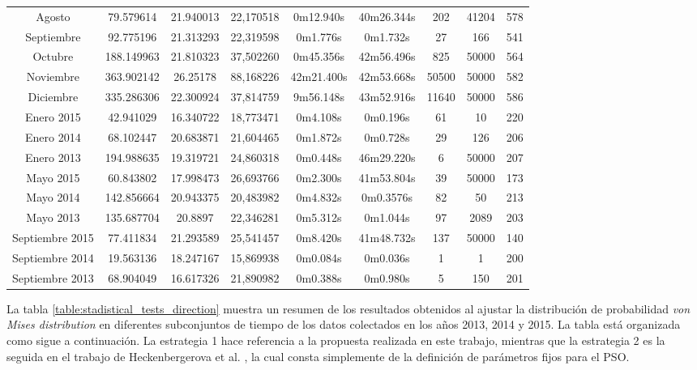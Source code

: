 \begin{table}[ht!]
{\begin{tabular}{|c|c|c|c|c|c|c|c|c|}
        Agosto          & 79.579614     & 21.940013     & 22,170518     & 0m12.940s     & 40m26.344s    & 202   & 41204 & 578 \\
        Septiembre      & 92.775196     & 21.313293     & 22,319598     & 0m1.776s      & 0m1.732s      & 27    & 166   & 541 \\
        Octubre         & 188.149963    & 21.810323     & 37,502260     & 0m45.356s     & 42m56.496s    & 825   & 50000 & 564 \\
        Noviembre       & 363.902142    & 26.25178      & 88,168226     & 42m21.400s    & 42m53.668s    & 50500 & 50000 & 582 \\
        Diciembre       & 335.286306    & 22.300924     & 37,814759     & 9m56.148s     & 43m52.916s    & 11640 & 50000 & 586 \\
        \hline 
        Enero 2015      & 42.941029     & 16.340722     & 18,773471     & 0m4.108s      & 0m0.196s      & 61    & 10    & 220 \\
        Enero 2014      & 68.102447     & 20.683871     & 21,604465     & 0m1.872s      & 0m0.728s      & 29    & 126   & 206 \\
        Enero 2013      & 194.988635    & 19.319721     & 24,860318     & 0m0.448s      & 46m29.220s    & 6     & 50000 & 207 \\
        Mayo 2015       & 60.843802     & 17.998473     & 26,693766     & 0m2.300s      & 41m53.804s    & 39    & 50000 & 173 \\
        Mayo 2014       & 142.856664    & 20.943375     & 20,483982     & 0m4.832s      & 0m0.3576s     & 82    & 50    & 213 \\
        Mayo 2013       & 135.687704    & 20.8897       & 22,346281     & 0m5.312s      & 0m1.044s      & 97    & 2089  & 203 \\
        Septiembre 2015 & 77.411834     & 21.293589     & 25,541457     & 0m8.420s      & 41m48.732s    & 137   & 50000 & 140 \\
        Septiembre 2014 & 19.563136     & 18.247167     & 15,869938     & 0m0.084s      & 0m0.036s      & 1     & 1     & 200 \\
        Septiembre 2013 & 68.904049     & 16.617326     & 21,890982     & 0m0.388s      & 0m0.980s      & 5     & 150   & 201 \\
        \hline  
    \end{tabular}
    }   
\end{table}
La tabla \ref{table:stadistical_tests_direction} muestra un resumen de los resultados obtenidos al ajustar la distribución de probabilidad \emph{von Mises distribution} en diferentes subconjuntos de tiempo de los datos colectados en los años 2013, 2014 y 2015. La tabla está organizada como sigue a continuación. La estrategia 1 hace referencia a la propuesta realizada en este trabajo, mientras que la estrategia 2 es la seguida en el trabajo de Heckenbergerova et al. \cite{Heckenbergerova15}, la cual consta simplemente de la definición de parámetros fijos para el PSO.
